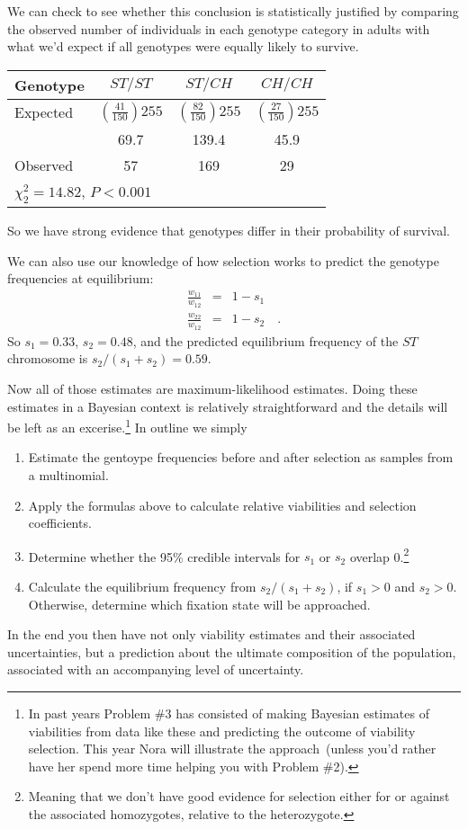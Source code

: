 We can check to see whether this conclusion is statistically justified
by comparing the observed number of individuals in each genotype
category in adults with what we'd expect if all genotypes were equally
likely to survive.
\begin{center}
\begin{tabular}{l|ccc}
\hline\hline
Genotype & $ST/ST$ & $ST/CH$ & $CH/CH$ \\
\hline
Expected & $\left(\frac{41}{150}\right)255$ &
  $\left(\frac{82}{150}\right)255$ & $\left(\frac{27}{150}\right)255$ \\
         & 69.7    & 139.4   & 45.9 \\
Observed & 57      & 169     & 29 \\
\hline
\multicolumn{4}{l}{$\chi^2_2 = 14.82$, $P < 0.001$}
\end{tabular}
\end{center}
So we have strong evidence that genotypes differ in their probability
of survival.

We can also use our knowledge of how selection works to predict the
genotype frequencies at equilibrium:
\begin{eqnarray*}
\frac{w_{11}}{w_{12}} &=& 1 - s_1 \\
\frac{w_{22}}{w_{12}} &=& 1 - s_2 \quad .
\end{eqnarray*}
So $s_1 = 0.33$, $s_2 = 0.48$, and the predicted equilibrium frequency
of the $ST$ chromosome is $s_2/(s_1+s_2) = 0.59$.

Now all of those estimates are maximum-likelihood estimates. Doing
these estimates in a Bayesian context is relatively straightforward
and the details will be left as an excerise.\footnote{In past years
  Problem \#3 has consisted of making Bayesian estimates of
  viabilities from data like these and predicting the outcome of
  viability selection. This year Nora will illustrate the
  approach~(unless you'd rather have her spend more time helping you
  with Problem \#2).} In outline we simply

\begin{enumerate}

\item Estimate the gentoype frequencies before and after selection as
  samples from a multinomial.

\item Apply the formulas above to calculate relative viabilities and
  selection coefficients.

\item Determine whether the 95\% credible intervals for $s_1$ or $s_2$
  overlap 0.\footnote{Meaning that we don't have good evidence for
  selection either for or against the associated homozygotes, relative
  to the heterozygote.}

\item Calculate the equilibrium frequency from $s_2/(s_1+s_2)$, if
  $s_1 > 0$ and $s_2 > 0$. Otherwise, determine which fixation state will be
  approached.

\end{enumerate}

\noindent In the end you then have not only viability estimates and
their associated uncertainties, but a prediction about the ultimate
composition of the population, associated with an accompanying level
of uncertainty.

